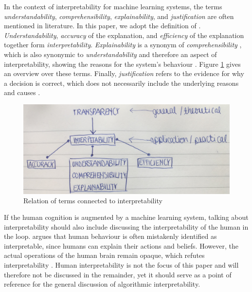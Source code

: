 In the context of interpretability for machine learning systems, the terms \textit{understandability}, \textit{comprehensibility}, \textit{explainability}, and \textit{justification} are often mentioned in literature. In this paper, we adopt the definition of \cite{ruping2006learning}. \textit{Understandability}, \textit{accuracy} of the explanation, and \textit{efficiency} of the explanation together form \textit{interpretability}. \textit{Explainability} is a synonym of \textit{comprehensibility} \cite{weihs2003combining}, which is also synonymic to \textit{understandability} \cite{bibal2016interpretability} and therefore an aspect of interpretability, showing the reasons for the system's behaviour \cite{gilpin2018explaining}. Figure \ref{fig:definitions} gives an overview over these terms. Finally, \textit{justification} refers to the evidence for why a decision is correct, which does not necessarily include the underlying reasons and causes \cite{biran2017explanation}.\newline
\begin{figure} [h]
	\centering
	\includegraphics[width=0.7\linewidth]{img/definitions}
	\caption{Relation of terms connected to interpretability}
	\label{fig:definitions}
\end{figure}
If the human cognition is augmented by a machine learning system, talking about interpretability should also include discussing the interpretability of the human in the loop. \cite{lipton2016mythos} argues that human behaviour is often mistakenly identified as interpretable, since humans can explain their actions and beliefs. However, the actual operations of the human brain remain opaque, which refutes interpretability \cite{lipton2016mythos}. Human interpretability is not the focus of this paper and will therefore not be discussed in the remainder, yet it should serve as a point of reference for the general discussion of algorithmic interpretability.\newline





